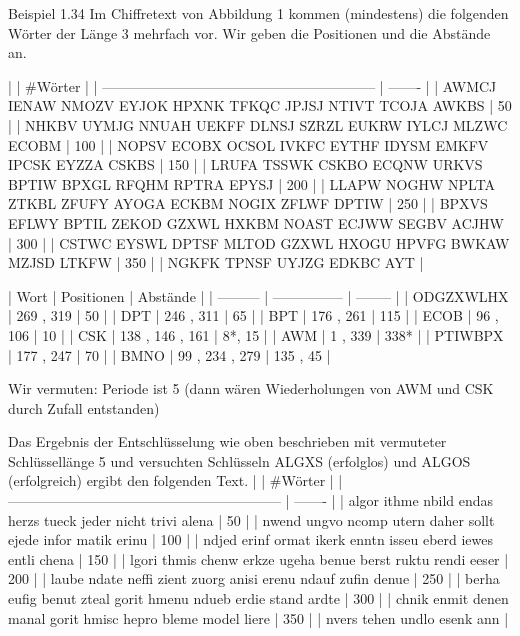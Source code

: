 \documentclass[a4paper]{article}
\begin{document}
\begin{multicols}{3}
        Beispiel 1.34 Im Chiffretext von Abbildung 1 kommen (mindestens) die folgenden Wörter der Länge 3  mehrfach vor. Wir geben die Positionen und die Abstände an.

        |                                                             | #Wörter |
        | ----------------------------------------------------------- | ------- |
        | AWMCJ IENAW NMOZV EYJOK HPXNK TFKQC JPJSJ NTIVT TCOJA AWKBS | 50      |
        | NHKBV UYMJG NNUAH UEKFF DLNSJ SZRZL EUKRW IYLCJ MLZWC ECOBM | 100     |
        | NOPSV ECOBX OCSOL IVKFC EYTHF IDYSM EMKFV IPCSK EYZZA CSKBS | 150     |
        | LRUFA TSSWK CSKBO ECQNW URKVS BPTIW BPXGL RFQHM RPTRA EPYSJ | 200     |
        | LLAPW NOGHW NPLTA ZTKBL ZFUFY AYOGA ECKBM NOGIX ZFLWF DPTIW | 250     |
        | BPXVS EFLWY BPTIL ZEKOD GZXWL HXKBM NOAST ECJWW SEGBV ACJHW | 300     |
        | CSTWC EYSWL DPTSF MLTOD GZXWL HXOGU HPVFG BWKAW MZJSD LTKFW | 350     |
        | NGKFK TPNSF UYJZG EDKBC AYT                                 |

        | Wort      | Positionen      | Abstände |
        | --------- | --------------- | -------- |
        | ODGZXWLHX | 269 , 319       | 50       |
        | DPT       | 246 , 311       | 65       |
        | BPT       | 176 , 261       | 115      |
        | ECOB      | 96 , 106        | 10       |
        | CSK       | 138 , 146 , 161 | 8*, 15   |
        | AWM       | 1 , 339         | 338*     |
        | PTIWBPX   | 177 , 247       | 70       |
        | BMNO      | 99 , 234 , 279  | 135 , 45 |

        Wir vermuten: Periode ist 5 (dann wären Wiederholungen von AWM und CSK durch Zufall entstanden)

        Das Ergebnis der Entschlüsselung wie oben beschrieben mit vermuteter Schlüssellänge 5 und versuchten Schlüsseln ALGXS (erfolglos) und ALGOS (erfolgreich) ergibt den folgenden Text.
        |                                                             | #Wörter |
        | ----------------------------------------------------------- | ------- |
        | algor ithme nbild endas herzs tueck jeder nicht trivi alena | 50      |
        | nwend ungvo ncomp utern daher sollt ejede infor matik erinu | 100     |
        | ndjed erinf ormat ikerk enntn isseu eberd iewes entli chena | 150     |
        | lgori thmis chenw erkze ugeha benue berst ruktu rendi eeser | 200     |
        | laube ndate neffi zient zuorg anisi erenu ndauf zufin denue | 250     |
        | berha eufig benut zteal gorit hmenu ndueb erdie stand ardte | 300     |
        | chnik enmit denen manal gorit hmisc hepro bleme model liere | 350     |
        | nvers tehen undlo esenk ann                                 |


\end{multicols}
\end{document}
